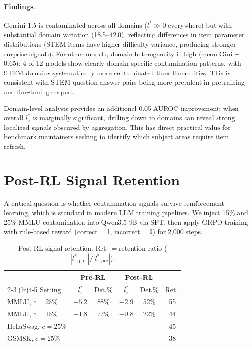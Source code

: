 \documentclass[11pt,a4paper]{article}
\begin{document}
\paragraph{Findings.} Gemini-1.5 is contaminated across all domains ($l_z^* \gg 0$ everywhere) but with substantial domain variation (18.5--42.0), reflecting differences in item parameter distributions (STEM items have higher difficulty variance, producing stronger surprise signals). For other models, domain heterogeneity is high (mean Gini = 0.65): 4 of 12 models show clearly domain-specific contamination patterns, with STEM domains systematically more contaminated than Humanities. This is consistent with STEM question-answer pairs being more prevalent in pretraining and fine-tuning corpora.

Domain-level analysis provides an additional 0.05 AUROC improvement: when overall $l_z^*$ is marginally significant, drilling down to domains can reveal strong localized signals obscured by aggregation. This has direct practical value for benchmark maintainers seeking to identify which subject areas require item refresh.

\section{Post-RL Signal Retention}
\label{sec:postrl}

A critical question is whether contamination signals survive reinforcement learning, which is standard in modern LLM training pipelines. We inject 15\% and 25\% MMLU contamination into Qwen3.5-9B via SFT, then apply GRPO training \citep{shao2024deepseekmath} with rule-based reward (correct$=$1, incorrect$=$0) for 2,000 steps.

\begin{table}[t]
\centering
\caption{Post-RL signal retention. Ret.\ = retention ratio ($|l_{z,\mathrm{post}}^{*}| / |l_{z,\mathrm{pre}}^{*}|$).}
\label{tab:postrl}
\small
\begin{tabular}{l cc cc c}
\toprule
& \multicolumn{2}{c}{Pre-RL} & \multicolumn{2}{c}{Post-RL} & \\
\cmidrule(lr){2-3} \cmidrule(lr){4-5}
Setting & $l_z^*$ & Det.\% & $l_z^*$ & Det.\% & Ret. \\
\midrule
MMLU, $c=25\%$ & $-5.2$ & 88\% & $-2.9$ & 52\% & .55 \\
MMLU, $c=15\%$ & $-1.8$ & 72\% & $-0.8$ & 22\% & .44 \\
HellaSwag, $c=25\%$ & -- & -- & -- & -- & .45 \\
GSM8K, $c=25\%$ & -- & -- & -- & -- & .38 \\
\bottomrule
\end{tabular}
\end{table}
\end{document}
